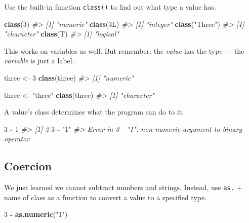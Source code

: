 \documentclass[
]{book}
\newenvironment{Shaded}{\begin{snugshade}}{\end{snugshade}}
\newcommand{\CommentTok}[1]{\textcolor[rgb]{0.56,0.35,0.01}{\textit{#1}}}
\newcommand{\DecValTok}[1]{\textcolor[rgb]{0.00,0.00,0.81}{#1}}
\newcommand{\KeywordTok}[1]{\textcolor[rgb]{0.13,0.29,0.53}{\textbf{#1}}}
\newcommand{\NormalTok}[1]{#1}
\newcommand{\OperatorTok}[1]{\textcolor[rgb]{0.81,0.36,0.00}{\textbf{#1}}}
\newcommand{\StringTok}[1]{\textcolor[rgb]{0.31,0.60,0.02}{#1}}
\begin{document}
Use the built-in function \texttt{class()} to find out what type a value has.

\begin{Shaded}
\begin{Highlighting}[]
\KeywordTok{class}\NormalTok{(}\DecValTok{3}\NormalTok{)}
\CommentTok{#> [1] "numeric"}
\KeywordTok{class}\NormalTok{(3L)}
\CommentTok{#> [1] "integer"}
\KeywordTok{class}\NormalTok{(}\StringTok{"Three"}\NormalTok{)}
\CommentTok{#> [1] "character"}
\KeywordTok{class}\NormalTok{(T)}
\CommentTok{#> [1] "logical"}
\end{Highlighting}
\end{Shaded}

This works on variables as well. But remember: the \emph{value} has the type --- the \emph{variable} is just a label.

\begin{Shaded}
\begin{Highlighting}[]
\NormalTok{three <-}\StringTok{ }\DecValTok{3}
\KeywordTok{class}\NormalTok{(three)}
\CommentTok{#> [1] "numeric"}

\NormalTok{three <-}\StringTok{ "three"}
\KeywordTok{class}\NormalTok{(three)}
\CommentTok{#> [1] "character"}
\end{Highlighting}
\end{Shaded}

A value's class determines what the program can do to it.

\begin{Shaded}
\begin{Highlighting}[]
\DecValTok{3} \OperatorTok{-}\StringTok{ }\DecValTok{1}
\CommentTok{#> [1] 2}
\DecValTok{3} \OperatorTok{-}\StringTok{ "1"}
\CommentTok{#> Error in 3 - "1": non-numeric argument to binary operator}
\end{Highlighting}
\end{Shaded}

\hypertarget{coercion}{%
\subsection{Coercion}\label{coercion}}

We just learned we cannot subtract numbers and strings. Instead, use \texttt{as.} + name of class as a function to convert a value to a specified type.

\begin{Shaded}
\begin{Highlighting}[]
\DecValTok{3} \OperatorTok{-}\StringTok{ }\KeywordTok{as.numeric}\NormalTok{(}\StringTok{"1"}\NormalTok{)}
\end{Highlighting}
\end{Shaded}
\end{document}
